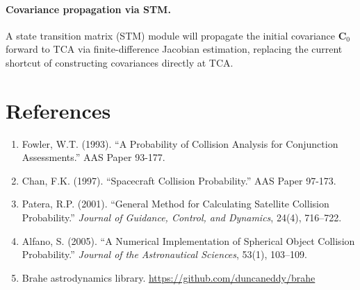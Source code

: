 \documentclass[11pt]{article}
\begin{document}
\paragraph{Covariance propagation via STM.}
A state transition matrix (STM) module will propagate the initial covariance
$\mathbf{C}_0$ forward to TCA via finite-difference Jacobian estimation,
replacing the current shortcut of constructing covariances directly at TCA.

\section*{References}

\begin{enumerate}
  \item Fowler, W.T. (1993). ``A Probability of Collision Analysis for Conjunction
        Assessments.'' AAS Paper 93-177.
  \item Chan, F.K. (1997). ``Spacecraft Collision Probability.'' AAS Paper 97-173.
  \item Patera, R.P. (2001). ``General Method for Calculating Satellite Collision
        Probability.'' \textit{Journal of Guidance, Control, and Dynamics},
        24(4), 716--722.
  \item Alfano, S. (2005). ``A Numerical Implementation of Spherical Object
        Collision Probability.'' \textit{Journal of the Astronautical Sciences},
        53(1), 103--109.
  \item Brahe astrodynamics library. \url{https://github.com/duncaneddy/brahe}
\end{enumerate}
\end{document}
